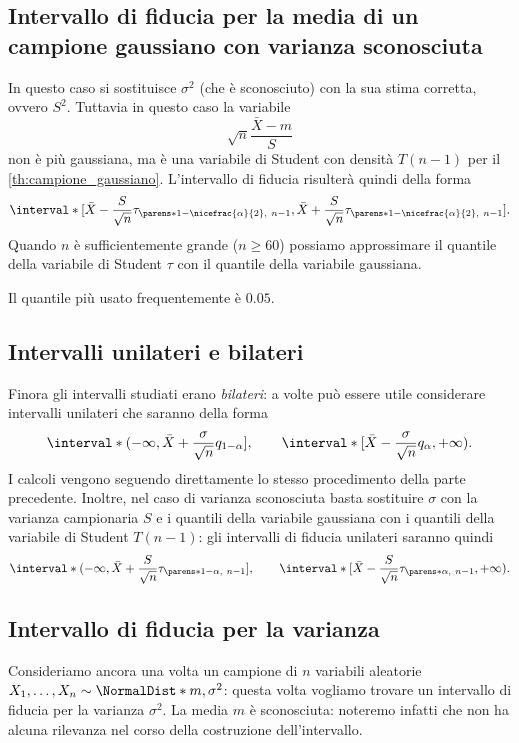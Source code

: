 \subsection*{Intervallo di fiducia per la media di un campione gaussiano con varianza sconosciuta}

In questo caso si sostituisce $\sigma^2$ (che è sconosciuto) con la sua stima corretta, ovvero $S^2$. Tuttavia in questo caso la variabile \[
    \sqrt{n}\frac{\bar X - m}{S}    
\] non è più gaussiana, ma è una variabile di Student con densità $T(n-1)$ per il \autoref{th:campione_gaussiano}. L'intervallo di fiducia risulterà quindi della forma \[
    \interval*[{\bar X - \frac{S}{\sqrt{n}}\tau_{\parens*{1 - \nicefrac{\alpha}{2},\ n - 1}}, \bar X + \frac{S}{\sqrt{n}}\tau_{\parens*{1 - \nicefrac{\alpha}{2},\ n - 1}}}].    
\] Quando $n$ è sufficientemente grande ($n \geq 60$) possiamo approssimare il quantile della variabile di Student $\tau$ con il quantile della variabile gaussiana.

Il quantile più usato frequentemente è $0.05$.

\subsection{Intervalli unilateri e bilateri}

Finora gli intervalli studiati erano \emph{bilateri}: a volte può essere utile considerare intervalli unilateri che saranno della forma \[
    \interval*({-\infty, \bar X + \frac{\sigma}{\sqrt{n}}q_{1-\alpha}}], \qquad
    \interval*[{\bar X - \frac{\sigma}{\sqrt{n}}q_\alpha, +\infty}).
\] I calcoli vengono seguendo direttamente lo stesso procedimento della parte precedente. Inoltre, nel caso di varianza sconosciuta basta sostituire $\sigma$ con la varianza campionaria $S$ e i quantili della variabile gaussiana con i quantili della variabile di Student $T(n-1)$: gli intervalli di fiducia unilateri saranno quindi
\[
    \interval*({-\infty, \bar X + \frac{S}{\sqrt{n}}\tau_{\parens*{1-\alpha,\ n-1}}}], \qquad
    \interval*[{\bar X - \frac{S}{\sqrt{n}}\tau_{\parens*{\alpha,\ n-1}}, +\infty}).
\]

\subsection*{Intervallo di fiducia per la varianza}

Consideriamo ancora una volta un campione di $n$ variabili aleatorie $X_1, \dots, X_n \sim \NormalDist*{m, \sigma^2}$: questa volta vogliamo trovare un intervallo di fiducia per la varianza $\sigma^2$. La media $m$ è sconosciuta: noteremo infatti che non ha alcuna rilevanza nel corso della costruzione dell'intervallo.


